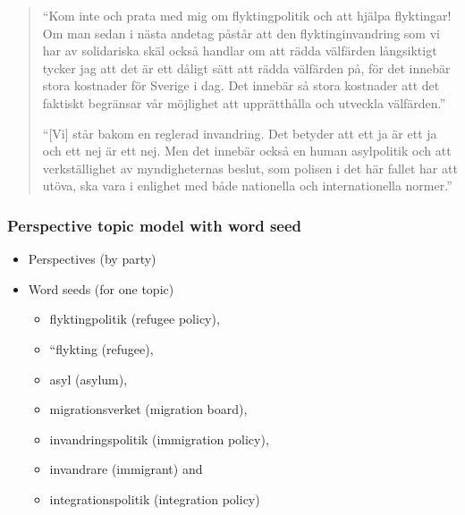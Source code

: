 \documentclass[compress]{beamer}
\begin{document}
\begin{frame}

\begin{quote}
\footnotesize
``Kom inte och prata med mig om flyktingpolitik och att hj\"{a}lpa flyktingar!
Om man sedan i n\"{a}sta andetag p\r{a}st\r{a}r att den flyktinginvandring som
vi har av solidariska sk\"{a}l ocks\r{a} handlar om att r\"{a}dda v\"{a}lf\"{a}rden l\r{a}ngsiktigt
tycker jag att det \"{a}r ett d\r{a}ligt s\"{a}tt att r\"{a}dda v\"{a}lf\"{a}rden p\r{a}, f\"{o}r
det inneb\"{a}r stora kostnader f\"{o}r Sverige i dag. Det inneb\"{a}r s\r{a} stora
kostnader att det faktiskt begr\"{a}nsar v\r{a}r m\"{o}jlighet att uppr\"{a}tth\r{a}lla
och utveckla v\"{a}lf\"{a}rden.''

\bigskip{}

\footnotesize
``{[}Vi{]} st\r{a}r bakom en reglerad invandring. Det betyder att ett
ja \"{a}r ett ja och ett nej \"{a}r ett nej. Men det inneb\"{a}r ocks\r{a} en human
asylpolitik och att verkst\"{a}llighet av myndigheternas beslut, som polisen
i det h\"{a}r fallet har att ut\"{o}va, ska vara i enlighet med b\r{a}de nationella
och internationella normer.''

\end{quote}

\end{frame}


\begin{frame}
\frametitle{Perspective topic model with word seed}

\begin{itemize}
    \item Perspectives (by party)
    \item Word seeds (for one topic)
    \begin{itemize}
        \item flyktingpolitik (refugee policy),
        \item ``flykting (refugee),
        \item asyl (asylum),
        \item migrationsverket (migration board),
        \item invandringspolitik (immigration policy),
        \item invandrare (immigrant) and
        \item integrationspolitik (integration policy)
    \end{itemize}
\end{itemize}

\end{frame}
\end{document}
